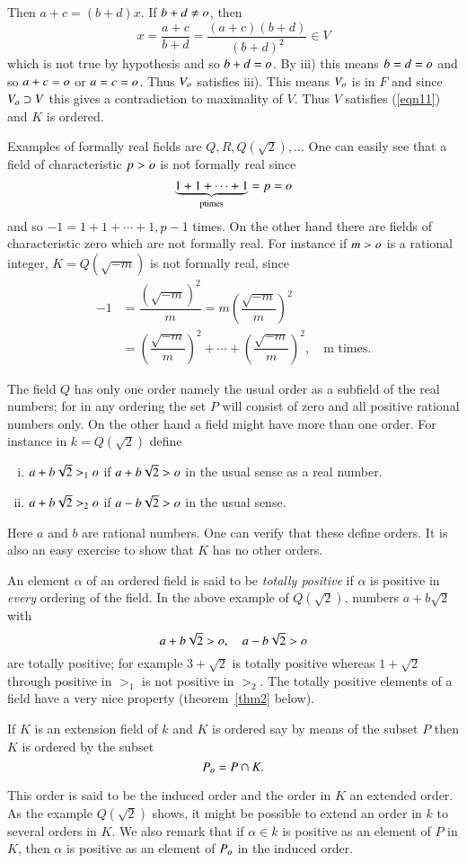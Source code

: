 \begin{Proof}
Then $a+c=(b+d)x$. If $b+d \neq o$, then
$$
x=\dfrac{a+c}{b+d}=\dfrac{(a+c)(b+d)}{(b+d)^{2}}\in V
$$
which is not true by hypothesis and so $b+d=o$. By iii) this means
$b=d=o$ and so $a+c=o$ or $a=c=o$. Thus $V_{o}$ satisfies
iii). This means $V_{o}$ is in $F$ and since $V_{o}\supset V$
this gives a contradiction to maximality of $V$. Thus $V$ satisfies
(\ref{eqn11}) and $K$ is ordered.

Examples of formally real fields are $Q,R,Q(\sqrt{2}),\ldots$ One can
easily see that a field of characteristic $p>o$ is not formally real
since
$$
\underbrace{1+1+\cdots+1}_{\text{ptimes}}=p=o
$$
and so $-1=1+1+\cdots+1, p-1$ times. On the other hand there are
fields of characteristic zero which are not formally real. For
instance if $m>o$ is a rational integer, $K=Q(\sqrt{-m})$ is not
formally real, since
\begin{align*}
-1&=\dfrac{(\sqrt{-m})^{2}}{m}=m\left(\dfrac{\sqrt{-m}}{m}\right)^{2}\\
&= \left(\dfrac{\sqrt{-m}}{m}\right)^{2}+\cdots+
\left(\dfrac{\sqrt{-m}}{m}\right)^{2}, \quad \text{m times.}
\end{align*}

The field $Q$ has only one order namely the usual order as a subfield
of the real numbers; for in any ordering the set $P$ will consist of
zero and all positive rational numbers only. On the other hand a field
might have more than one order. For instance in $k=Q(\sqrt{2})$ define


\begin{enumerate}[i)]
\item $a+b\sqrt{2} >_1 o$ if $a+b\sqrt{2}>o$ in the usual sense as
  a real number.

\item $a+b\sqrt{2}>_2 o$ if $a-b\sqrt{2}>o$ in the usual sense.
\end{enumerate}

Here $a$ and $b$ are rational numbers. One can verify that these
define orders. It is also an easy exercise to show that $K$ has no
other orders.

An element $\alpha$ of an ordered field is said to be \textit{totally
  positive} if $\alpha$ is positive in \textit{every} ordering of the
field. In the above example of $Q(\sqrt{2})$, numbers $a+b\sqrt{2}$
with 
$$
a+b\sqrt{2}>o,\quad a-b\sqrt{2}>o
$$
are totally positive; for example $3+\sqrt{2}$ is totally positive
whereas $1+\sqrt{2}$ through positive in $>_1$ is not positive in
$>_2$. The totally positive elements of a field have a very nice
property (theorem~\ref{thm2} below).

If $K$ is an extension field of $k$ and $K$ is ordered say by means of
the subset $P$ then $K$ is ordered by the subset
$$
P_{o}=P\cap K.
$$

This order is said to be the induced order and the order in $K$ an
extended order. As the example $Q(\sqrt{2})$ shows, it might be
possible to extend an order in $k$ to several orders in $K$. We also
remark that if $\alpha \in k$ is positive as an element of $P$ in
$K$, then $\alpha$ is positive as an element of $P_o$ in the induced order.
\enprf
\end{Proof}

